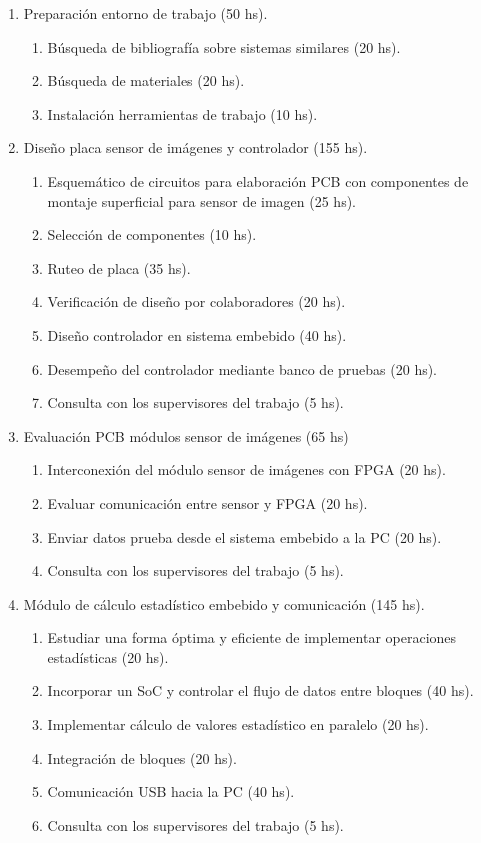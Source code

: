 \documentclass[
11pt, %
codirector, %
]{charter}
\begin{document}
\begin{enumerate}
\item Preparación entorno de trabajo (50 hs).
	\begin{enumerate}
	\item Búsqueda de bibliografía sobre sistemas similares (20 hs).
	\item Búsqueda de materiales (20 hs).
	\item Instalación herramientas de trabajo (10 hs).
	\end{enumerate}

\item Diseño placa sensor de imágenes y controlador (155 hs).
	\begin{enumerate}
	\item Esquemático de circuitos para elaboración PCB con componentes de montaje superficial para sensor de imagen (25 hs).
	\item Selección de componentes (10 hs).
	\item Ruteo de placa (35 hs).
	\item Verificación de diseño por colaboradores (20 hs).
	\item Diseño controlador en sistema embebido (40 hs).
	\item Desempeño del controlador mediante banco de pruebas (20 hs).
	\item Consulta con los supervisores del trabajo (5 hs).
	\end{enumerate}

\item Evaluación PCB módulos sensor de imágenes (65 hs)
	\begin{enumerate}
	\item Interconexión del módulo sensor de imágenes con FPGA (20 hs).
	\item Evaluar comunicación entre sensor y FPGA (20 hs).
	\item Enviar datos prueba desde el sistema embebido a la PC (20 hs).
	\item Consulta con los supervisores del trabajo (5 hs).
	\end{enumerate}

\item Módulo de cálculo estadístico embebido y comunicación (145 hs).
	\begin{enumerate}
	\item Estudiar una forma óptima y eficiente de implementar operaciones estadísticas (20 hs).
	\item Incorporar un SoC y controlar el flujo de datos entre bloques (40 hs).
	\item Implementar cálculo de valores estadístico en paralelo (20 hs).
	\item Integración de bloques (20 hs).
	\item Comunicación USB hacia la PC (40 hs).
	\item Consulta con los supervisores del trabajo (5 hs).
	\end{enumerate}	


\end{enumerate}
\end{document}
